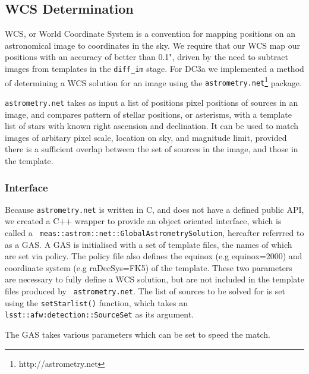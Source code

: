 
\subsection{WCS Determination} \label{sec:wcs}

WCS, or World Coordinate System is a convention for mapping positions
on an astronomical image to coordinates in the sky. We require that
our WCS map our positions with an accuracy of better than 0.1", driven
by the need to subtract images from templates in the {\tt diff\_im}
stage. For DC3a we implemented a method of determining a WCS solution
for an image using the {\tt astrometry.net}\footnote{http://astrometry.net} package.

{\tt astrometry.net} takes as input a list of positions pixel
positions of sources in an image, and compares pattern of stellar
positions, or asterisms, with a template list of stars with known
right ascension and declination. It can be used to match images of
arbitary pixel scale, location on sky, and magnitude limit, provided
there is a sufficient overlap between the set of sources in the image,
and those in the template.

\subsubsection{Interface}
Because {\tt astrometry.net} is written in C, and does not have a
defined public API, we created a C++ wrapper to provide an object
oriented interface, which is called a {\tt
  meas::astrom::net::GlobalAstrometrySolution}, hereafter referrred to as
a GAS. A GAS is initialised with a set of template files, the names of
which are set via policy. The policy file also defines the equinox
(e.g equinox=2000) and coordinate system (e.g raDecSys=FK5) of the
template. These two parameters are necessary to fully define a WCS
solution, but are not included in the template files produced by {\tt
  astrometry.net}. The list of sources to be solved for is set using
the {\tt setStarlist()} function, which takes an {\tt
  lsst::afw:detection::SourceSet} as its argument.


The GAS takes various parameters which can be set to speed the match. 

